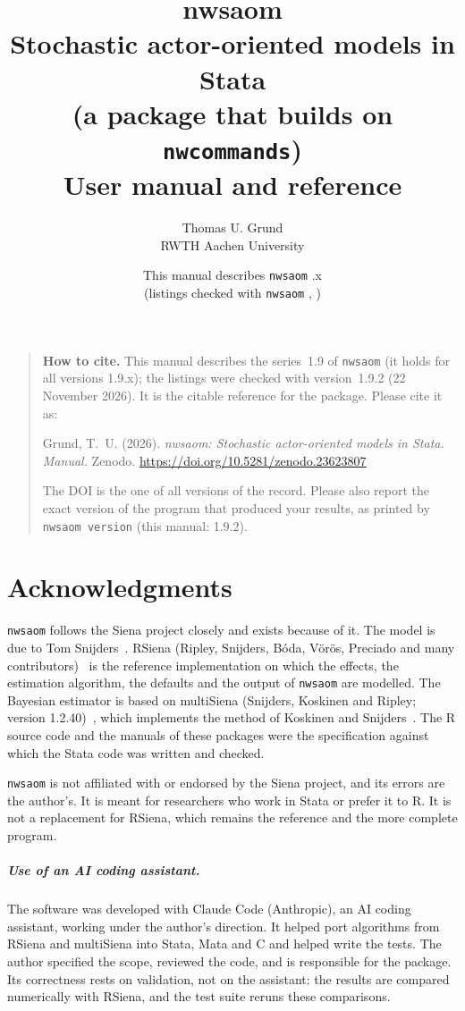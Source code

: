 \documentclass[11pt,a4paper]{report}
\title{\textbf{nwsaom}\\[4pt]\large Stochastic actor-oriented models in Stata\\ (a package that builds on \texttt{nwcommands})\\[6pt]\normalsize User manual and reference}
\author{Thomas U. Grund\\ RWTH Aachen University}
\date{This manual describes \texttt{nwsaom} \manualseries.x\\ (listings checked with \texttt{nwsaom} \pkgversion, \pkgdate)}
\newcommand{\nwsaom}{\texttt{nwsaom}}
\newcommand{\manualseries}{1.9}
\newcommand{\pkgversion}{1.9.2}
\newcommand{\pkgdate}{22 November 2026}
\newcommand{\manualdoi}{10.5281/zenodo.23623807}
\begin{document}
\maketitle
\begin{quote}\noindent\textbf{How to cite.} This manual describes the series~\manualseries{} of \texttt{nwsaom} (it holds for all versions \manualseries.x); the listings were checked with version~\pkgversion{} (\pkgdate). It is the citable reference for the package. Please cite it as:\par\smallskip
\noindent Grund, T.~U. (2026). \emph{nwsaom: Stochastic actor-oriented models in Stata. Manual.} Zenodo. \url{https://doi.org/\manualdoi}\par\smallskip
\noindent The DOI is the one of all versions of the record. Please also report the exact version of the program that produced your results, as printed by \texttt{nwsaom version} (this manual: \pkgversion).
\end{quote}
\chapter*{Acknowledgments}
\nwsaom{} follows the Siena project closely and exists because of it. The model is due to Tom Snijders~\cite{snijders1996,snijders2001}. RSiena (Ripley, Snijders, B\'{o}da, V\"{o}r\"{o}s, Preciado and many contributors)~\cite{ripley} is the reference implementation on which the effects, the estimation algorithm, the defaults and the output of \nwsaom{} are modelled. The Bayesian estimator is based on multiSiena (Snijders, Koskinen and Ripley; version 1.2.40)~\cite{multisiena}, which implements the method of Koskinen and Snijders~\cite{koskinen2007}. The R source code and the manuals of these packages were the specification against which the Stata code was written and checked.

\nwsaom{} is not affiliated with or endorsed by the Siena project, and its errors are the author's. It is meant for researchers who work in Stata or prefer it to R. It is not a replacement for RSiena, which remains the reference and the more complete program.

\paragraph{Use of an AI coding assistant.} The software was developed with Claude Code (Anthropic), an AI coding assistant, working under the author's direction. It helped port algorithms from RSiena and multiSiena into Stata, Mata and C and helped write the tests. The author specified the scope, reviewed the code, and is responsible for the package. Its correctness rests on validation, not on the assistant: the results are compared numerically with RSiena, and the test suite reruns these comparisons.
\end{document}
